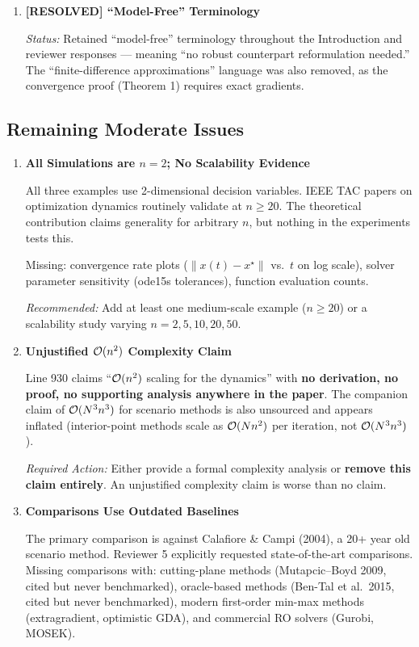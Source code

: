 \documentclass[journal,twoside,web]{ieeecolor}
\begin{document}
\begin{enumerate}
\item \textbf{{\color{ForestGreen}[RESOLVED]} ``Model-Free'' Terminology}

\textit{Status:} Retained ``model-free'' terminology throughout the Introduction and reviewer responses --- meaning ``no robust counterpart reformulation needed.'' The ``finite-difference approximations'' language was also removed, as the convergence proof (Theorem 1) requires exact gradients.

\end{enumerate}

\subsection*{Remaining Moderate Issues}

\begin{enumerate}[resume]

\item \textbf{All Simulations are $n=2$; No Scalability Evidence}

All three examples use 2-dimensional decision variables. IEEE TAC papers on optimization dynamics routinely validate at $n \geq 20$. The theoretical contribution claims generality for arbitrary $n$, but nothing in the experiments tests this.

Missing: convergence rate plots ($\|x(t) - x^\star\|$ vs.\ $t$ on log scale), solver parameter sensitivity (ode15s tolerances), function evaluation counts.

\textit{Recommended:} Add at least one medium-scale example ($n \geq 20$) or a scalability study varying $n = 2, 5, 10, 20, 50$.

\item \textbf{Unjustified ${\cal O}(n^2)$ Complexity Claim}

Line 930 claims ``${\cal O}(n^2)$ scaling for the dynamics'' with \textbf{no derivation, no proof, no supporting analysis anywhere in the paper}. The companion claim of ${\cal O}(N^3 n^3)$ for scenario methods is also unsourced and appears inflated (interior-point methods scale as ${\cal O}(Nn^2)$ per iteration, not ${\cal O}(N^3 n^3)$).

\textit{Required Action:} Either provide a formal complexity analysis or \textbf{remove this claim entirely}. An unjustified complexity claim is worse than no claim.

\item \textbf{Comparisons Use Outdated Baselines}

The primary comparison is against Calafiore \& Campi (2004), a 20+ year old scenario method. Reviewer 5 explicitly requested state-of-the-art comparisons. Missing comparisons with: cutting-plane methods (Mutapcic--Boyd 2009, cited but never benchmarked), oracle-based methods (Ben-Tal et al.\ 2015, cited but never benchmarked), modern first-order min-max methods (extragradient, optimistic GDA), and commercial RO solvers (Gurobi, MOSEK).


\end{enumerate}
\end{document}
